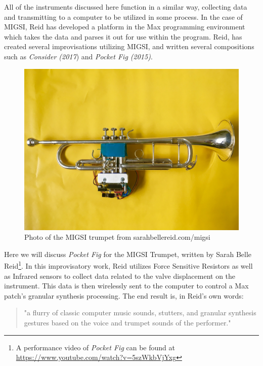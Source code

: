 All of the instruments discussed here function in a similar way, collecting data and transmitting to a computer to be utilized in some process. In the case of MIGSI, Reid has developed a platform in the Max programming environment which takes the data and parses it out for use within the program.\cite{reid_2019} Reid, has created several improvisations utilizing MIGSI, and written several compositions such as \textit{Consider (2017}) and \textit{Pocket Fig (2015)}.

\begin{figure}
    \centering
    \includegraphics[scale=0.25]{diagrams/MIGSI.jpg}
    \caption{Photo of the MIGSI trumpet from sarahbellereid.com/migsi}
    \label{fig:MIGSI}
\end{figure}


Here we will discuss \textit{Pocket Fig} for the MIGSI Trumpet, written by Sarah Belle Reid\footnote{A performance video of \textit{Pocket Fig} can be found at \url{https://www.youtube.com/watch?v=5szWkbVjYxg}}. In this improvisatory work, Reid utilizes Force Sensitive Resistors as well as Infrared sensors to collect data related to the valve displacement on the instrument. This data is then wirelessly sent to the computer to control a Max patch's granular synthesis processing. The end result is, in Reid's own words: 

\begin{quote}
    "a flurry of classic computer music sounds, stutters, and granular synthesis gestures based on the voice and trumpet sounds of the performer."
\end{quote}

